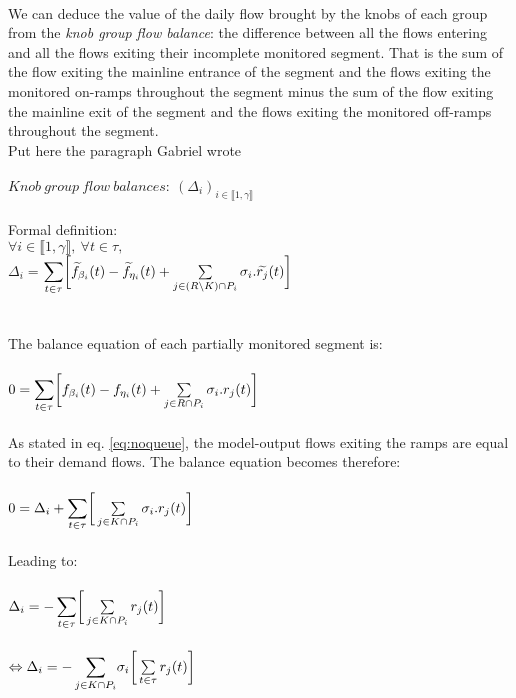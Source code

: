\\
We can deduce the value of the daily flow brought by the knobs of each group from the \emph{knob group flow balance}: the difference between all the flows entering and all the flows exiting their incomplete monitored segment. That is the sum of the flow exiting the mainline entrance of the segment and the flows exiting the monitored on-ramps throughout the segment minus the sum of the flow exiting the mainline exit of the segment and the flows exiting the monitored off-ramps throughout the segment. \\ 
\color{red}Put here the paragraph Gabriel wrote\color{black}\\
\\
$Knob\ group\ flow\ balances:\ (\Delta_{i})_{i\in \llbracket 1,\gamma \rrbracket} $\\
\\
Formal definition:\\
$\forall i \in \llbracket 1,\gamma \rrbracket,\ \forall t\in \tau,$\\
$\Delta_{i} =$\small $\mathlarger{\sum\limits_{t\in \tau}}\bigg[\widetilde{f}_{\beta_{i}}(t)-\widetilde{f}_{\eta_{i}}(t)+\sum\limits_{j\in (R\backslash K)\cap P_{i}}\sigma_{i}.\widetilde{r_{j}}(t)\bigg]$\normalsize 
\\
\\
\\
The balance equation of each partially monitored segment is:\\
\\
$0=\mathlarger{\sum\limits_{t\in \tau}}\bigg[f_{\beta_{i}}(t)-f_{\eta_{i}}(t)+\sum\limits_{j\in R\cap P_{i}}\sigma_{i}.r_{j}(t)\bigg]$\\
\\
As stated in eq. \ref{eq:noqueue}, the model-output flows exiting the ramps are equal to their demand flows. The balance equation becomes therefore:\\
\\
$0=\Delta_{i}+\mathlarger{\sum\limits_{t\in \tau}}\bigg[\sum\limits_{j\in K\cap P_{i}}\sigma_{i}.r_{j}(t)\bigg]$\\
\\
Leading to:\\
\\
$\Delta_{i}=\mathlarger{-\sum\limits_{t\in \tau}}\bigg[\sum\limits_{j\in K\cap P_{i}}r_{j}(t)\bigg]$\\
\\
$\Leftrightarrow \Delta_{i}=\mathlarger{-\sum\limits_{j\in K\cap P_{i}}}\sigma_{i}\bigg[\sum\limits_{t\in \tau}r_{j}(t)\bigg]$\\
